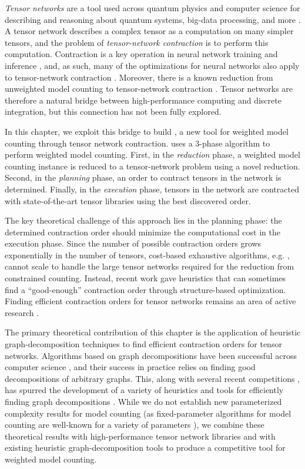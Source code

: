 \emph{Tensor networks} are a tool used across quantum physics and computer science for describing and reasoning about quantum systems, big-data processing, and more \cite{BB17,Cichocki14,Orus19}.
A tensor network describes a complex tensor as a computation on many simpler tensors, and the problem of \emph{tensor-network contraction} is to perform this computation. 
Contraction is a key operation in neural network training and inference \cite{BK07,Hirata03,KKCLA17,VZTGDMVAC18}, and, as such, many of the optimizations for neural networks also apply to tensor-network contraction \cite{KSTKPPRS19,NRBHHJN15,RMGZFZHVL19}.
Moreover, there is a known reduction from unweighted model counting to tensor-network contraction \cite{BMT15}.
Tensor networks are therefore a natural bridge between high-performance computing and discrete integration, but this connection has not been fully explored.

In this chapter, we exploit this bridge to build , a new tool for weighted model counting through tensor network contraction.  uses a 3-phase algorithm to perform weighted model counting. First, in the \emph{reduction} phase, a weighted model counting instance is reduced to a tensor-network problem using a novel reduction. Second, in the \emph{planning} phase, an order to contract tensors in the network is determined. Finally, in the \emph{execution} phase, tensors in the network are contracted with state-of-the-art tensor libraries using the best discovered order.

The key theoretical challenge of this approach lies in the planning phase: the determined contraction order should minimize the computational cost in the execution phase. Since the number of possible contraction orders grows exponentially in the number of tensors, cost-based exhaustive algorithms, e.g. \cite{PHV14}, cannot scale to handle the large tensor networks required for the reduction from constrained counting. Instead, recent work \cite{KCMR18} gave heuristics that can sometimes find a ``good-enough'' contraction order through structure-based optimization. Finding efficient contraction orders for tensor networks remains an area of active research \cite{RTPCTSL19}.

The primary theoretical contribution of this chapter is the application of heuristic graph-decomposition techniques to find efficient contraction orders for tensor networks. Algorithms based on graph decompositions have been successful across computer science \cite{GLST17,MPPV04}, and their success in practice relies on finding good decompositions of arbitrary graphs. This, along with several recent competitions \cite{DKTW18}, has spurred the development of a variety of heuristics and tools for efficiently finding graph decompositions \cite{AMW17,HS18,Tamaki17}. While we do not establish new parameterized complexity results for model counting (as fixed-parameter algorithms for model counting are well-known for a variety of parameters \cite{FMR08,SS10}), we combine these theoretical results with high-performance tensor network libraries and with existing heuristic graph-decomposition tools to produce a competitive tool for weighted model counting.

